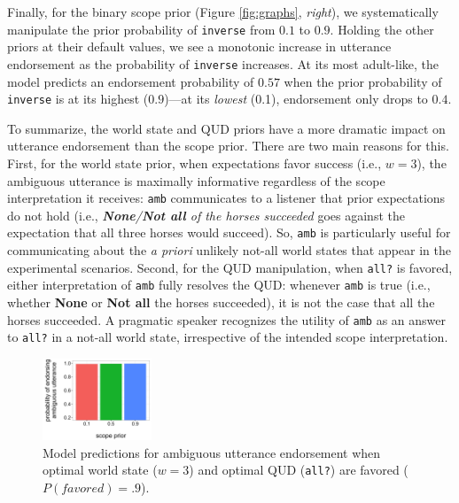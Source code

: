 \documentclass[10pt,a4paper]{article}
\begin{document}
Finally, for the binary scope prior (Figure \ref{fig:graphs}, \emph{right}), we systematically manipulate the prior probability of \texttt{inverse} from $0.1$ to $0.9$. Holding the other priors at their default values, we see a monotonic increase in utterance endorsement as the probability of \texttt{inverse} increases. At its most adult-like, the model predicts an endorsement probability of $0.57$ when the prior probability of \texttt{inverse} is at its highest ($0.9$)---at its \emph{lowest} (0.1), endorsement only drops to $0.4$.

To summarize, the world state and QUD priors have a more dramatic impact on utterance endorsement than the scope prior.  There are two main reasons for this. 
First, for the world state prior, when expectations favor success (i.e., $w=3$), the ambiguous utterance is maximally informative regardless of the scope interpretation it receives: \texttt{amb} communicates to a listener that prior  expectations do not hold 
(i.e., \textit{\textbf{None}/\textbf{Not all} of the horses succeeded} goes against the expectation that all three horses would succeed). So, \texttt{amb} is particularly useful for communicating about the \emph{a priori} unlikely not-all world states that appear in the experimental scenarios. 
Second, for the QUD manipulation, when \texttt{all?} is favored, 
 either interpretation of \texttt{amb} fully resolves the QUD: whenever \texttt{amb} is true (i.e., whether \textbf{None} or \textbf{Not all} the horses succeeded), it is not the case that all the horses succeeded. A pragmatic speaker recognizes the utility of \texttt{amb} as an answer to \texttt{all?} in a not-all world state, irrespective of the intended scope interpretation.


\begin{figure}[ht]
\centering
\includegraphics[width = 0.29\textwidth]{fig3.jpg}
\vspace{-5pt}
\caption{Model predictions for ambiguous utterance endorsement when optimal world state ($w=3$) and optimal QUD (\texttt{all?}) are favored ($P(favored) = .9$).}
\label{fig:interaction}
\end{figure}
\end{document}
